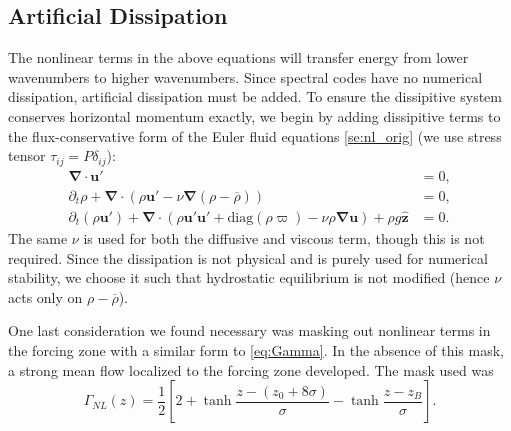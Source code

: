 \documentclass[
        fleqn,
        usenatbib,
    ]{mnras}
\newcommand*{\s}[1]{\left[#1\right]}
\newcommand*{\bm}[1]{\mathbf{#1}}
\newcommand*{\uv}[1]{\hat{\mathbf{#1}}}
\begin{document}
\subsection{Artificial Dissipation}

The nonlinear terms in the above equations will transfer energy from lower
wavenumbers to higher wavenumbers. Since spectral codes have no numerical
dissipation, artificial dissipation must be added. To ensure the dissipitive
system conserves horizontal momentum exactly, we begin by adding dissipitive
terms to the flux-conservative form of the Euler fluid equations
\autoref{se:nl_orig} (we use stress tensor $\tau_{ij} = P\delta_{ij}$):
\begin{subequations}
    \begin{align}
        \bm{\nabla} \cdot \bm{u}' &= 0,\\
        \partial_t \rho + \bm{\nabla} \cdot (\rho \bm{u}' - \nu
            \bm{\nabla}(\rho - \overline{\rho})) &= 0,\label{eq:visc_cons_mom}\\
        \partial_t (\rho \bm{u}') + \bm{\nabla} \cdot (\rho \bm{u}' \bm{u}'
            + \mathrm{diag}(\rho \varpi)
            - \nu \rho \bm{\nabla}\bm{u})
            + \rho g \uv{z} &= 0.
    \end{align}
\end{subequations}
The same $\nu$ is used for both the diffusive and viscous term, though this is
not required. Since the dissipation is not physical and is purely used for
numerical stability, we choose it such that hydrostatic equilibrium is not
modified (hence $\nu$ acts only on $\rho - \overline{\rho}$).

One last consideration we found necessary was masking out nonlinear terms in the
forcing zone with a similar form to \autoref{eq:Gamma}. In the absence of this
mask, a strong mean flow localized to the forcing zone developed. The mask used
was
\begin{equation}
    \Gamma_{NL}(z) = \frac{1}{2}\s{2
        + \tanh \frac{z - (z_0 + 8\sigma)}{\sigma}
        - \tanh \frac{z - z_B}{\sigma}}.
\end{equation}
\end{document}

